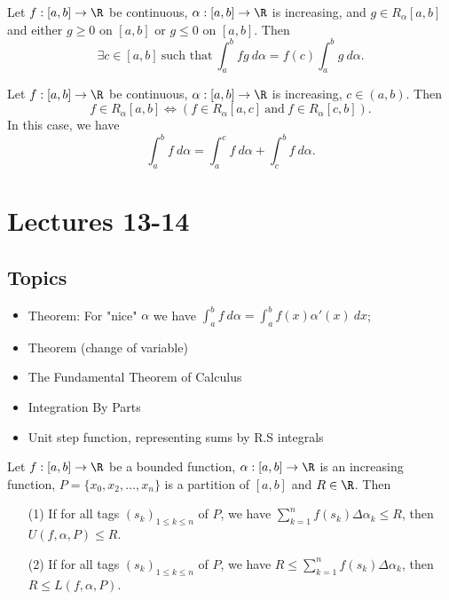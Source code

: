 \begin{theorem}
    Let \( f:[a,b] \to \R  \) be continuous, \( \alpha:[a,b] \to \R  \) is increasing, and \( g \in {R}_{\alpha}[a,b]  \) and either \( g \geq 0  \) on \( [a,b] \) or \( g \leq 0  \) on \( [a,b] \). Then
    \[  \exists c \in [a,b] \ \text{such that} \ \int_{ a }^{ b }  fg  \ d \alpha = f(c) \int_{ a }^{ b }  g  \ d \alpha. \]
\end{theorem}

\begin{theorem}
    Let \( f:[a,b]  \to \R \) be continuous, \( \alpha:[a,b] \to \R  \) is increasing, \( c \in (a,b) \). Then
    \[  f \in {R}_{\alpha}[a,b] \iff (f \in {R}_{\alpha}[a,c] \ \text{and} \ f \in {R}_{\alpha}[c,b]). \]
    In this case, we have 
    \[  \int_{ a }^{ b }  f  \ d \alpha = \int_{ a }^{ c }  f  \ d \alpha + \int_{ c }^{ b  }  f \ d \alpha. \]
\end{theorem}

\section{Lectures 13-14}

\subsection{Topics}

\begin{itemize}
    \item Theorem: For "nice" \( \alpha \) we have \( \displaystyle \int_{ a }^{ b }  f  \ d \alpha  = \int_{ a }^{ b }  f(x) \alpha'(x) \ dx \);
    \item Theorem (change of variable)
    \item The Fundamental Theorem of Calculus
    \item Integration By Parts
    \item Unit step function, representing sums by R.S integrals
\end{itemize}

\begin{lemma}
    Let \( f: [a,b] \to \R  \) be a bounded function, \( \alpha: [a,b] \to \R  \) is an increasing function, \( P = \{ {x}_{0}, {x}_{2}, \dots, {x}_{n} \}  \) is a partition of \( [a,b] \) and \( R \in \R  \). Then  
    \begin{enumerate}
        \item[(1)] If for all tags \( ({s}_{k })_{1 \leq k \leq n }  \) of \( P  \), we have \( \sum_{ k=1  }^{ n } f({s}_{k}) \Delta {\alpha}_{k } \leq R  \), then \( U(f,\alpha,P) \leq R  \).
        \item[(2)] If for all tags \( ({s}_{k})_{1 \leq k \leq n } \) of \( P  \), we have \( R \leq \sum_{ k=1  }^{ n } f({s}_{k}) \Delta {\alpha}_{k } \), then \( R \leq L(f,\alpha, P) \).
    \end{enumerate}
\end{lemma}

